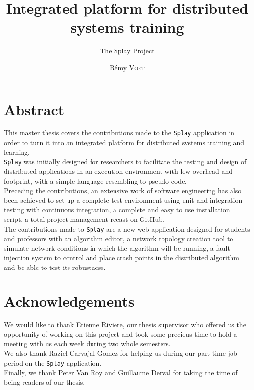 \documentclass{eplmastersthesis}
\title{Integrated platform for distributed systems training}
\subtitle{The Splay Project}
\author{Rémy \textsc{Voet}}
\begin{document}
  \maketitle

  \chapter*{Abstract}

    This master thesis covers the contributions made to the \texttt{Splay} application
    in order to turn it into an integrated platform for distributed systems
    training and learning.\\
    \texttt{Splay} was initially designed for researchers to facilitate the testing and
    design of distributed applications in an execution environment with low
    overhead and footprint, with a simple language resembling to pseudo-code.\\

    Preceding the contributions, an extensive work of software engineering has
    also been achieved to set up a complete test environment using unit and
    integration testing with continuous integration, a complete and easy to use
    installation script, a total project management recast on GitHub.\\

    The contributions made to \texttt{Splay} are a new web application designed
    for students and professors with an algorithm editor, a network topology
    creation tool to simulate network conditions in which the algorithm will
    be running, a fault injection system to control and place crash points
    in the distributed algorithm and be able to test its robustness.

  \chapter*{Acknowledgements}

    We would like to thank Etienne Riviere, our thesis supervisor who offered
    us the opportunity of working on this project and took some precious time
    to hold a meeting with us each week during two whole semesters.\\

    We also thank Raziel Carvajal Gomez for helping us during our
    part-time job period on the \texttt{Splay} application.\\

    Finally, we thank Peter Van Roy and Guillaume Derval for taking the time
    of being readers of our thesis.
\end{document}

